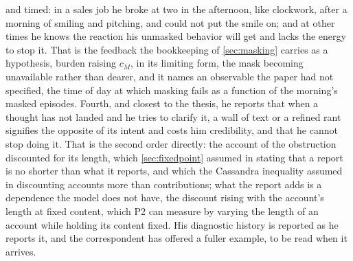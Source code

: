 and timed: in a sales job he broke at two in the afternoon, like clockwork, after a morning of smiling and pitching, and could not put the smile on; and at other times he knows the reaction his unmasked behavior will get and lacks the energy to stop it. That is the feedback the bookkeeping of \autoref{sec:masking} carries as a hypothesis, burden raising $c_M$, in its limiting form, the mask becoming unavailable rather than dearer, and it names an observable the paper had not specified, the time of day at which masking fails as a function of the morning's masked episodes. Fourth, and closest to the thesis, he reports that when a thought has not landed and he tries to clarify it, a wall of text or a refined rant signifies the opposite of its intent and costs him credibility, and that he cannot stop doing it. That is the second order directly: the account of the obstruction discounted for its length, which \autoref{sec:fixedpoint} assumed in stating that a report is no shorter than what it reports, and which the Cassandra inequality assumed in discounting accounts more than contributions; what the report adds is a dependence the model does not have, the discount rising with the account's length at fixed content, which P2 can measure by varying the length of an account while holding its content fixed. His diagnostic history is reported as he reports it, and the correspondent has offered a fuller example, to be read when it arrives.
